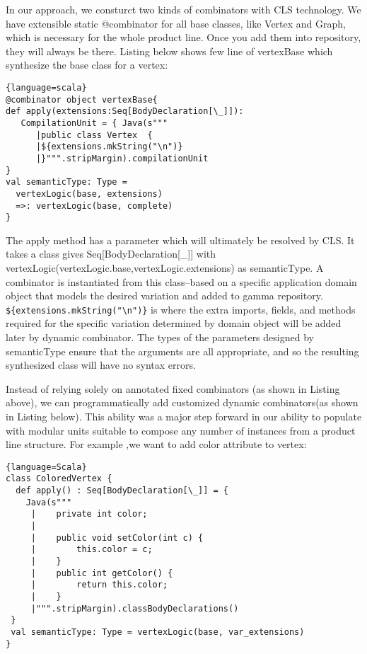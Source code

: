  In our approach, we consturct two kinds of combinators with CLS technology. We have extensible static @combinator for all base classes,
  like Vertex and Graph, which is necessary for the whole product line. Once you add them into repository,
   they will always be there. Listing below shows few line of vertexBase which synthesize the base class for a vertex:

\begin{lstlisting}{language=scala}
@combinator object vertexBase{
def apply(extensions:Seq[BodyDeclaration[\_]]):
   CompilationUnit = { Java(s"""
      |public class Vertex  {
      |${extensions.mkString("\n")}
      |}""".stripMargin).compilationUnit
}
val semanticType: Type =
  vertexLogic(base, extensions)
  =>: vertexLogic(base, complete)
}
\end{lstlisting}

The apply method has a parameter which will ultimately be resolved by CLS. It takes a class gives
Seq[BodyDeclaration[\_]] with vertexLogic(vertexLogic.base,vertexLogic.extensions) as semanticType. A combinator is instantiated
from this class–based on a specific application domain object that models the desired variation and added to gamma
 repository. \verb+${extensions.mkString("\n")}+ is where the extra imports, fields, and methods required for
 the specific variation determined by domain object will be added later by dynamic combinator. The types of the parameters designed by semanticType ensure
 that the arguments are all appropriate, and so the resulting synthesized class will have no syntax errors.

Instead of relying solely on annotated fixed combinators (as shown in Listing above), we can programmatically
add customized dynamic combinators(as shown in Listing below). This ability was a major step forward in our ability to populate with modular
units suitable to compose any number of instances from a product line structure. For example ,we want to add color
attribute to vertex:

\begin{lstlisting}{language=Scala}
class ColoredVertex {
  def apply() : Seq[BodyDeclaration[\_]] = {
    Java(s"""
     |    private int color;
     |
     |    public void setColor(int c) {
     |        this.color = c;
     |    }
     |    public int getColor() {
     |        return this.color;
     |    }
     |""".stripMargin).classBodyDeclarations()
 }
 val semanticType: Type = vertexLogic(base, var_extensions)
}
\end{lstlisting}

